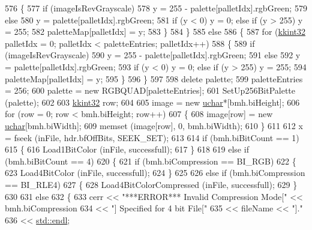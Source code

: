 \begin{DoxyCode}
576     \{
577       \textcolor{keywordflow}{if}  (imageIsRevGrayscale)
578         y = 255 - palette[palletIdx].rgbGreen;
579       \textcolor{keywordflow}{else}
580         y = palette[palletIdx].rgbGreen;
581       \textcolor{keywordflow}{if}  (y < 0)  y = 0;  \textcolor{keywordflow}{else} \textcolor{keywordflow}{if}  (y > 255)  y = 255;
582       paletteMap[palletIdx] = y;
583     \}
584   \}
585   \textcolor{keywordflow}{else}
586   \{
587     \textcolor{keywordflow}{for}  (\hyperlink{namespace_k_k_b_a8fa4952cc84fda1de4bec1fbdd8d5b1b}{kkint32} palletIdx = 0; palletIdx < paletteEntries; palletIdx++)
588     \{
589       \textcolor{keywordflow}{if}  (imageIsRevGrayscale)
590         y = 255 - palette[palletIdx].rgbGreen;
591       \textcolor{keywordflow}{else}
592         y = palette[palletIdx].rgbGreen;
593       \textcolor{keywordflow}{if}  (y < 0)  y = 0;  \textcolor{keywordflow}{else} \textcolor{keywordflow}{if}  (y > 255)  y = 255;
594       paletteMap[palletIdx] = y;
595     \}
596   \}
597 
598   \textcolor{keyword}{delete} palette;
599   paletteEntries = 256;
600   palette = \textcolor{keyword}{new} RGBQUAD[paletteEntries];
601   SetUp256BitPalette (palette);
602 
603   \hyperlink{namespace_k_k_b_a8fa4952cc84fda1de4bec1fbdd8d5b1b}{kkint32}  row;
604 
605   image = \textcolor{keyword}{new} \hyperlink{namespace_k_k_b_ace9969169bf514f9ee6185186949cdf7}{uchar}*[bmh.biHeight];
606   \textcolor{keywordflow}{for}  (row = 0; row < bmh.biHeight; row++)
607   \{
608     image[row] = \textcolor{keyword}{new} \hyperlink{namespace_k_k_b_ace9969169bf514f9ee6185186949cdf7}{uchar}[bmh.biWidth];
609     memset (image[row], 0, bmh.biWidth);
610   \}
611 
612   x = fseek (inFile, hdr.bfOffBits, SEEK\_SET);
613 
614   \textcolor{keywordflow}{if}  (bmh.biBitCount == 1)
615   \{
616     Load1BitColor (inFile, successfull);
617   \}
618 
619   \textcolor{keywordflow}{else} \textcolor{keywordflow}{if}  (bmh.biBitCount == 4)
620   \{
621     \textcolor{keywordflow}{if}  (bmh.biCompression == BI\_RGB)
622     \{
623       Load4BitColor (inFile, successfull);
624     \}
625 
626     \textcolor{keywordflow}{else} \textcolor{keywordflow}{if}  (bmh.biCompression == BI\_RLE4)
627     \{
628       Load4BitColorCompressed (inFile, successfull);
629     \}
630 
631     \textcolor{keywordflow}{else}
632     \{
633       cerr << \textcolor{stringliteral}{"***ERROR***  Invalid Compression Mode["} << bmh.biCompression 
634            << \textcolor{stringliteral}{"] Specified for 4 bit File["}
635            << fileName << \textcolor{stringliteral}{"]."}
636            << \hyperlink{namespace_k_k_b_ad1f50f65af6adc8fa9e6f62d007818a8}{std::endl};

\end{DoxyCode}
